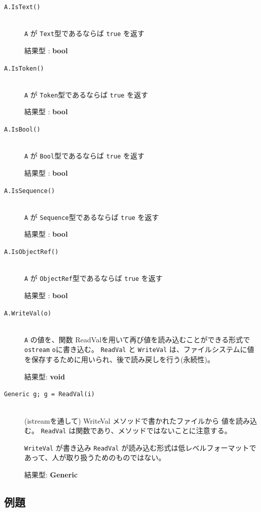 \documentclass[\pformat,12pt]{jarticle}
\begin{document}
\begin{description}
\item[{\tt A.IsText()}] \mbox{}\\
     {\tt A} が {\tt Text}型であるならば {\tt true} を返す

     結果型 : {\bf bool}

\item[{\tt A.IsToken()}] \mbox{}\\
      {\tt A} が {\tt Token}型であるならば {\tt true} を返す

     結果型 : {\bf bool}

\item[{\tt A.IsBool()}] \mbox{}\\
     {\tt A} が {\tt Bool}型であるならば {\tt true} を返す

     結果型 : {\bf bool}

\item[{\tt A.IsSequence()}] \mbox{}\\
      {\tt A} が {\tt Sequence}型であるならば {\tt true} を返す

     結果型 : {\bf bool}

\item[{\tt A.IsObjectRef()}] \mbox{}\\
     {\tt A} が {\tt ObjectRef}型であるならば {\tt true} を返す

     結果型 : {\bf bool}

\item[{\tt A.WriteVal(o)}] \mbox{}\\
{\tt A} の値を、関数 ReadValを用いて再び値を読み込むことができる形式で {\tt ostream} {\tt o}に書き込む。
  {\tt ReadVal} と {\tt WriteVal} は、ファイルシステムに値を保存するために用いられ、後で読み戻しを行う(永続性)。

  結果型: {\bf void}
  
\item[{\tt Generic g; g = ReadVal(i)}] \mbox{}\\
  (istreamを通して)  WriteVal メソッドで書かれたファイルから 値を読み込む。
 {\tt ReadVal} は関数であり、メソッドではないことに注意する。
  
  {\tt WriteVal} が書き込み {\tt ReadVal} が読み込む形式は低レベルフォーマットであって、人が取り扱うためのものではない。
  
  結果型: {\bf Generic}
\end{description}


\subsection*{例題}
\end{document}
